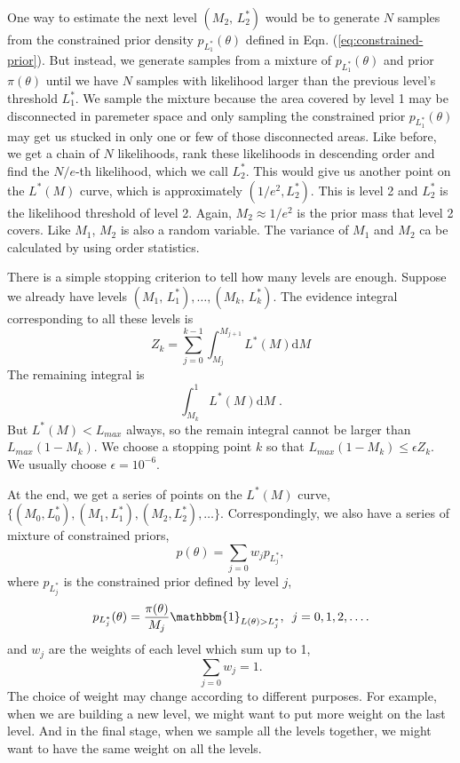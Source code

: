 \documentclass[letterpaper, preprint]{aastex}
\begin{document}
One way to estimate the next level $\left(M_2, \,L^*_2\right)$ would be to generate $N$ samples from  the constrained prior density $p_{L_1^*}(\theta)$ defined in Eqn. (\ref{eq:constrained-prior}). But instead, we generate samples from a mixture of $p_{L_1^*}(\theta)$ and prior $\pi(\theta)$ until we have $N$ samples with likelihood larger than  the previous level's threshold $L_1^*$. We sample the mixture because the area covered by level 1 may be disconnected in paremeter space and only sampling the constrained prior $p_{L_1^*}(\theta)$ may get us stucked in only one or few of those disconnected areas. Like before, we get a chain of $N$ likelihoods, rank these likelihoods in descending order and find the $N/e$-th likelihood, which we call $L_2^*$. This would give us another point on the $L^*(M)$ curve, which is approximately $(1/e^2,L_2^*)$. This is level 2 and $L_2^*$ is the likelihood threshold of level 2. Again, $M_2\approx1/e^2$ is the prior mass that level 2 covers. Like $M_1$, $M_2$ is also a random variable. The variance of $M_1$ and $M_2$ ca be calculated by using order statistics.

There is a simple stopping criterion to tell how many levels are enough. Suppose we already have levels $\left(M_1,\,L^*_1\right), \ldots, \left(M_k,\,L^*_k\right)$. The evidence integral corresponding to all these levels is
$$
Z_k = \sum_{j=0}^{k-1} \int_{M_j}^{M_{j+1}} L^*(M)\mathrm{d}M 
$$
The remaining integral is
$$
\int_{M_k}^1 L^*(M) \mathrm{d}M \; .
$$
But $L^*(M) < L_{max}$ always, so the remain integral cannot be larger than $L_{max}(1-M_k)$. We choose a stopping point $k$ so that $L_{max}(1-M_k) \leq \epsilon Z_k$. We usually choose $\epsilon = 10^{-6}$.

At the end, we get a series of points on the $L^*(M)$ curve, $\{(M_0, L_0^*),(M_1,L_1^*),(M_2,L_2^*), \ldots\}$. Correspondingly, we also have a series of mixture of constrained priors,
\begin{equation}
p(\theta) = \sum_{j=0} w_j p_{L_j^*},
\label{eq:mixture-constrained-prior}
\end{equation}
where $p_{L_j^*}$ is the constrained prior defined by level $j$,
\begin{equation} 
p_{L_j^*}(\theta) = \frac{\pi(\theta)}{M_j}\mathbbm{1}_{L(\theta)>L_j^*},\,\,\,j=0,1,2,\ldots.
\end{equation}
and $w_j$ are the weights of each level which sum up to 1,
\begin{equation}
\sum_{j=0}w_j = 1.
\end{equation}
The choice of weight may change according to different purposes. For example, when we are building a new level, we might want to put more weight on the last level. And in the final stage, when we sample all the levels together, we might want to have the same weight on all the levels.
\end{document}
